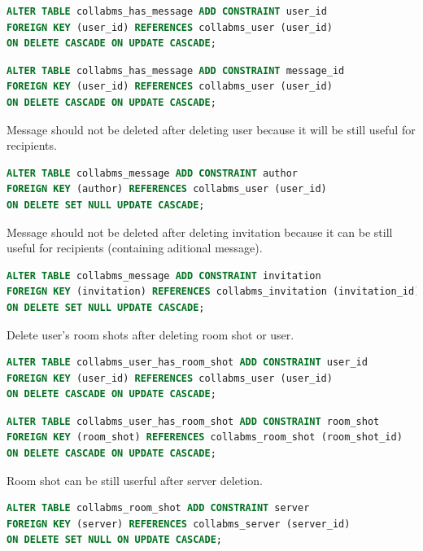 \documentclass[12pt,oneside,a4paper]{article}
\begin{document}
\begin{lstlisting}[language=SQL]
ALTER TABLE collabms_has_message ADD CONSTRAINT user_id
FOREIGN KEY (user_id) REFERENCES collabms_user (user_id)
ON DELETE CASCADE ON UPDATE CASCADE;
\end{lstlisting}

\begin{lstlisting}[language=SQL]
ALTER TABLE collabms_has_message ADD CONSTRAINT message_id
FOREIGN KEY (user_id) REFERENCES collabms_user (user_id)
ON DELETE CASCADE ON UPDATE CASCADE;
\end{lstlisting}

\noindent
Message should not be deleted after deleting user because it will be still useful for recipients.

\begin{lstlisting}[language=SQL]
ALTER TABLE collabms_message ADD CONSTRAINT author
FOREIGN KEY (author) REFERENCES collabms_user (user_id)
ON DELETE SET NULL UPDATE CASCADE;
\end{lstlisting}

\noindent
Message should not be deleted after deleting invitation because it can be still useful for recipients (containing aditional message).

\begin{lstlisting}[language=SQL]
ALTER TABLE collabms_message ADD CONSTRAINT invitation
FOREIGN KEY (invitation) REFERENCES collabms_invitation (invitation_id)
ON DELETE SET NULL UPDATE CASCADE;
\end{lstlisting}

\noindent
Delete user's room shots after deleting room shot or user.

\begin{lstlisting}[language=SQL]
ALTER TABLE collabms_user_has_room_shot ADD CONSTRAINT user_id
FOREIGN KEY (user_id) REFERENCES collabms_user (user_id)
ON DELETE CASCADE ON UPDATE CASCADE;
\end{lstlisting}

\begin{lstlisting}[language=SQL]
ALTER TABLE collabms_user_has_room_shot ADD CONSTRAINT room_shot
FOREIGN KEY (room_shot) REFERENCES collabms_room_shot (room_shot_id)
ON DELETE CASCADE ON UPDATE CASCADE;
\end{lstlisting}

\noindent
Room shot can be still userful after server deletion.

\begin{lstlisting}[language=SQL]
ALTER TABLE collabms_room_shot ADD CONSTRAINT server
FOREIGN KEY (server) REFERENCES collabms_server (server_id)
ON DELETE SET NULL ON UPDATE CASCADE;
\end{lstlisting}
\end{document}
